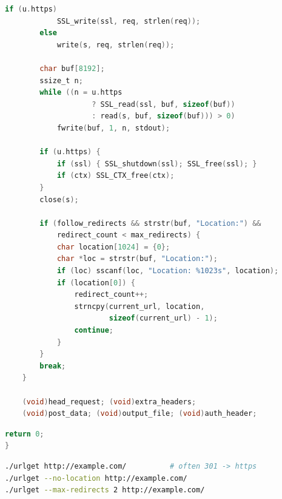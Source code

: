 \begin{lstlisting}[style=newcode,language=C,firstnumber=last]
        if (u.https)
            SSL_write(ssl, req, strlen(req));
        else
            write(s, req, strlen(req));

        char buf[8192];
        ssize_t n;
        while ((n = u.https
                    ? SSL_read(ssl, buf, sizeof(buf))
                    : read(s, buf, sizeof(buf))) > 0)
            fwrite(buf, 1, n, stdout);

        if (u.https) {
            if (ssl) { SSL_shutdown(ssl); SSL_free(ssl); }
            if (ctx) SSL_CTX_free(ctx);
        }
        close(s);

        if (follow_redirects && strstr(buf, "Location:") &&
            redirect_count < max_redirects) {
            char location[1024] = {0};
            char *loc = strstr(buf, "Location:");
            if (loc) sscanf(loc, "Location: %1023s", location);
            if (location[0]) {
                redirect_count++;
                strncpy(current_url, location,
                        sizeof(current_url) - 1);
                continue;
            }
        }
        break;
    }

    (void)head_request; (void)extra_headers;
    (void)post_data; (void)output_file; (void)auth_header;
\end{lstlisting}
\begin{lstlisting}[style=oldcode,language=C,firstnumber=last]
    return 0;
}
\end{lstlisting}
\FullSourceStop

\begin{lstlisting}[style=snippet,language=bash]
./urlget http://example.com/          # often 301 -> https
./urlget --no-location http://example.com/
./urlget --max-redirects 2 http://example.com/
\end{lstlisting}
